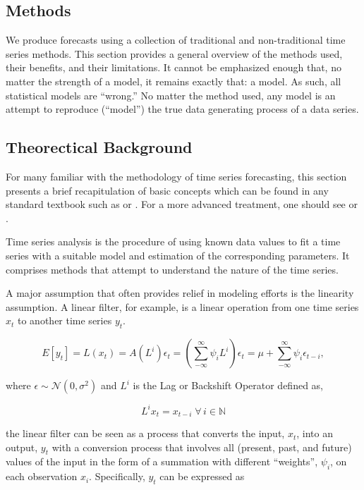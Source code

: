 \documentclass[
  11pt,
]{article}
\begin{document}
\hypertarget{methods}{%
\subsection{Methods}\label{methods}}

We produce forecasts using a collection of traditional and
non-traditional time series methods. This section provides a general
overview of the methods used, their benefits, and their limitations. It
cannot be emphasized enough that, no matter the strength of a model, it
remains exactly that: a model. As such, all statistical models are
``wrong.'' No matter the method used, any model is an attempt to
reproduce (``model'') the true data generating process of a data series.

\hypertarget{theorectical-background}{%
\subsection{Theorectical Background}\label{theorectical-background}}

For many familiar with the methodology of time series forecasting, this
section presents a brief recapitulation of basic concepts which can be
found in any standard textbook such as \cite{MJK} or \cite{brockwell02}.
For a more advanced treatment, one should see \cite{hamilton94} or
\cite{brockwell06}.

Time series analysis is the procedure of using known data values to fit
a time series with a suitable model and estimation of the corresponding
parameters. It comprises methods that attempt to understand the nature
of the time series.

A major assumption that often provides relief in modeling efforts is the
linearity assumption. A linear filter, for example, is a linear
operation from one time series \(x_{t}\) to another time series
\(y_{t}\).

\[
E[y_{t}] = L(x_{t}) = A(L^{i})\epsilon_{t} = \left(\sum\limits_{-\infty}^{\infty} \psi_{i}L^{i}\right)\epsilon_{t} = \mu + \sum\limits_{-\infty}^{\infty}\psi_{i}\epsilon_{t-i},
\]

where \(\epsilon \sim \mathcal{N}(0, \sigma^{2})\) and \(L^{i}\) is the
Lag or Backshift Operator defined as,

\[
L^{i}x_{t} = x_{t-i} \; \forall \, i \in \mathbb{N}
\]

the linear filter can be seen as a process that converts the input,
\(x_{t}\), into an output, \(y_{t}\) with a conversion process that
involves all (present, past, and future) values of the input in the form
of a summation with different ``weights'', \(\psi_{i}\), on each
observation \(x_{i}\). Specifically, \(y_{t}\) can be expressed as
\end{document}
